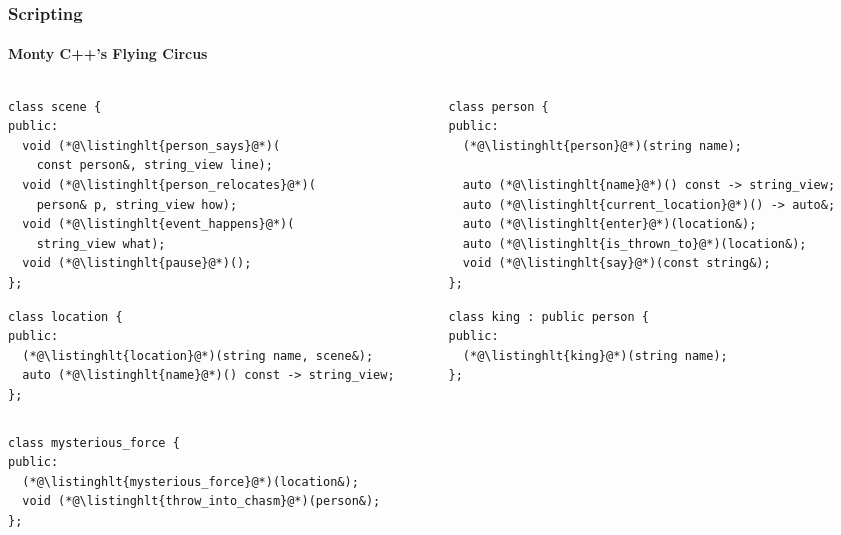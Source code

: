 \documentclass[compress,table,xcolor=table]{beamer}
\begin{document}
\begin{frame}[fragile]
  \frametitle{Scripting}
  \framesubtitle{Monty C++'s Flying Circus}
  \begin{columns}
    \begin{column}{.50\textwidth}
    \begin{lstlisting}[language=c++2x,basicstyle=\tiny\ttfamily]
class scene {
public:
  void (*@\listinghlt{person_says}@*)(
    const person&, string_view line);
  void (*@\listinghlt{person_relocates}@*)(
    person& p, string_view how);
  void (*@\listinghlt{event_happens}@*)(
    string_view what);
  void (*@\listinghlt{pause}@*)();
};

    \end{lstlisting}
    \begin{lstlisting}[language=c++2x,basicstyle=\tiny\ttfamily]
class location {
public:
  (*@\listinghlt{location}@*)(string name, scene&);
  auto (*@\listinghlt{name}@*)() const -> string_view;
};
    \end{lstlisting}
    \end{column}
    \begin{column}{.50\textwidth}
    \begin{lstlisting}[language=c++2x,basicstyle=\tiny\ttfamily]
class person {
public:
  (*@\listinghlt{person}@*)(string name);

  auto (*@\listinghlt{name}@*)() const -> string_view;
  auto (*@\listinghlt{current_location}@*)() -> auto&;
  auto (*@\listinghlt{enter}@*)(location&);
  auto (*@\listinghlt{is_thrown_to}@*)(location&);
  void (*@\listinghlt{say}@*)(const string&);
};
    \end{lstlisting}
    \begin{lstlisting}[language=c++2x,basicstyle=\tiny\ttfamily]
class king : public person {
public:
  (*@\listinghlt{king}@*)(string name);
};
    \end{lstlisting}
    \end{column}
  \end{columns}
  \begin{lstlisting}[language=c++2x,basicstyle=\scriptsize\ttfamily]
class mysterious_force {
public:
  (*@\listinghlt{mysterious_force}@*)(location&);
  void (*@\listinghlt{throw_into_chasm}@*)(person&);
};
    \end{lstlisting}
\end{frame}
\end{document}
